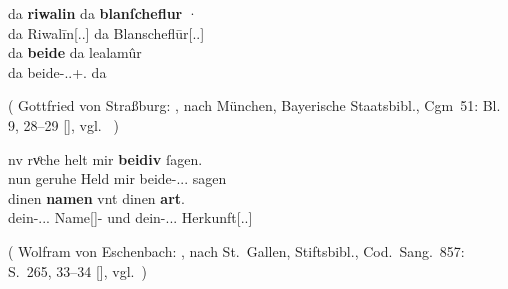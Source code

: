 \begin{exe}
\ex \label{ex:askedal73pr}
	\begin{xlist}
	\ex \label{ex:askedal73pr_1}
		\gll da \textbf{riwalin} da {\textbf{blanſcheflur} ·} \\
			da Riwalīn[\Nom.\Sg.\M] da Blanscheflūr[\Nom.\Sg.\F] \\
	\sn \gll da \textbf{beide} da lealamûr \\
			da beide-\Nom.\Pl.\M+\F.\St{} da  \\
		\begin{taggedline}{(%
				Gottfried von Straßburg: ,
				nach München, Bayerische Staatsbibl., Cgm~51: Bl. 9, 28--29
				[\cite[1286]{hsc}],
				vgl.~\cite[22~{[=~V.~1359--1360]}]{maroldschroeder1969}%
			)}
		\trans {}
		\end{taggedline}

	\ex \label{ex:askedal73pr_2}
		\gll nv rvͦche helt mir \textbf{beidiv} ſagen. \\
			nun geruhe Held mir beide-\Acc.\Pl.\N.\St{} sagen \\
	\sn \gll dinen \textbf{namen} vnt dinen \textbf{art}. \\
			dein-\Acc.\Sg.\M.\St{} Name[\M]-\Obl{}
			und dein-\Acc.\Sg.\M.\St{} Herkunft[\Acc.\Sg.\M] \\
		\begin{taggedline}{(%
				Wolfram von Eschenbach: \tit{Parzival},
				nach St.~Gallen, Stiftsbibl., Cod.~Sang.~857: S.~265\tsup{a}, 33--34
				[\cite[1211]{hsc}],
				vgl.~\cite[749~{[=~745.18--19]}]{knechtschirok2003})}
		\trans {}\footnotemark
		\end{taggedline}
	\end{xlist}
\end{exe}
%

